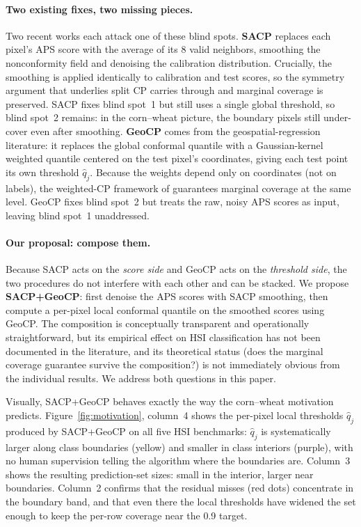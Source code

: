 \documentclass[11pt]{article}
\newcommand{\1}{\mathbf{1}}
\begin{document}
\paragraph{Two existing fixes, two missing pieces.}
Two recent works each attack one of these blind spots. \textbf{SACP} \citep{liu2024sacp} replaces each pixel's APS score with the average of its 8 valid neighbors, smoothing the nonconformity field and denoising the calibration distribution. Crucially, the smoothing is applied identically to calibration and test scores, so the symmetry argument that underlies split CP carries through and marginal coverage is preserved. SACP fixes blind spot~1 but still uses a single global threshold, so blind spot~2 remains: in the corn--wheat picture, the boundary pixels still under-cover even after smoothing. \textbf{GeoCP} \citep{lou2024geoconformal} comes from the geospatial-regression literature: it replaces the global conformal quantile with a Gaussian-kernel weighted quantile centered on the test pixel's coordinates, giving each test point its own threshold $\hat q_j$. Because the weights depend only on coordinates (not on labels), the weighted-CP framework of \citet{tibshirani2019conformal} guarantees marginal coverage at the same level. GeoCP fixes blind spot~2 but treats the raw, noisy APS scores as input, leaving blind spot~1 unaddressed.

\paragraph{Our proposal: compose them.}
Because SACP acts on the \emph{score side} and GeoCP acts on the \emph{threshold side}, the two procedures do not interfere with each other and can be stacked. We propose \textbf{SACP+GeoCP}: first denoise the APS scores with SACP smoothing, then compute a per-pixel local conformal quantile on the smoothed scores using GeoCP. The composition is conceptually transparent and operationally straightforward, but its empirical effect on HSI classification has not been documented in the literature, and its theoretical status (does the marginal coverage guarantee survive the composition?) is not immediately obvious from the individual results. We address both questions in this paper.

Visually, SACP+GeoCP behaves exactly the way the corn--wheat motivation predicts. Figure~\ref{fig:motivation}, column~4 shows the per-pixel local thresholds $\hat q_j$ produced by SACP+GeoCP on all five HSI benchmarks: $\hat q_j$ is systematically larger along class boundaries (yellow) and smaller in class interiors (purple), with no human supervision telling the algorithm where the boundaries are. Column~3 shows the resulting prediction-set sizes: small in the interior, larger near boundaries. Column~2 confirms that the residual misses (red dots) concentrate in the boundary band, and that even there the local thresholds have widened the set enough to keep the per-row coverage near the 0.9 target.
\end{document}
